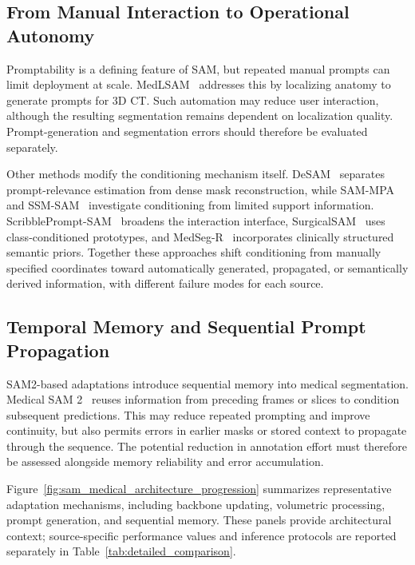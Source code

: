 \documentclass[5p,times,authoryear]{elsarticle}
\begin{document}
\subsection{From Manual Interaction to Operational Autonomy}

Promptability is a defining feature of SAM, but repeated manual prompts can limit deployment at scale. MedLSAM~\citep{lei2025medlsam} addresses this by localizing anatomy to generate prompts for 3D CT. Such automation may reduce user interaction, although the resulting segmentation remains dependent on localization quality. Prompt-generation and segmentation errors should therefore be evaluated separately.

Other methods modify the conditioning mechanism itself. DeSAM~\citep{gao2024desam} separates prompt-relevance estimation from dense mask reconstruction, while SAM-MPA~\citep{xu2024sammpa} and SSM-SAM~\citep{leng2024self} investigate conditioning from limited support information. ScribblePrompt-SAM~\citep{wong2024scribbleprompt} broadens the interaction interface, SurgicalSAM~\citep{yue2024surgicalsam} uses class-conditioned prototypes, and MedSeg-R~\citep{shao2025medseg} incorporates clinically structured semantic priors. Together these approaches shift conditioning from manually specified coordinates toward automatically generated, propagated, or semantically derived information, with different failure modes for each source.

\subsection{Temporal Memory and Sequential Prompt Propagation}

SAM2-based adaptations introduce sequential memory into medical segmentation. Medical SAM 2~\citep{zhu2024medical} reuses information from preceding frames or slices to condition subsequent predictions. This may reduce repeated prompting and improve continuity, but also permits errors in earlier masks or stored context to propagate through the sequence. The potential reduction in annotation effort must therefore be assessed alongside memory reliability and error accumulation.

Figure~\ref{fig:sam_medical_architecture_progression} summarizes representative adaptation mechanisms, including backbone updating, volumetric processing, prompt generation, and sequential memory. These panels provide architectural context; source-specific performance values and inference protocols are reported separately in Table~\ref{tab:detailed_comparison}.
\end{document}
